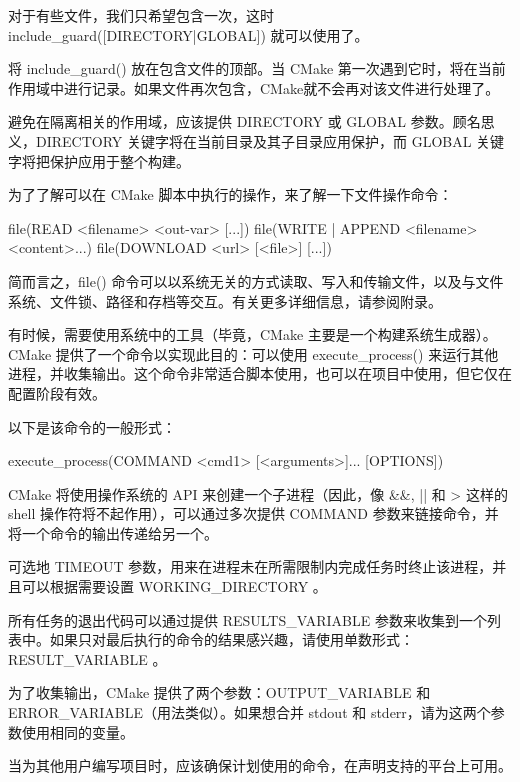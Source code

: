 
对于有些文件，我们只希望包含一次，这时 include\_guard([DIRECTORY|GLOBAL]) 就可以使用了。

将 include\_guard() 放在包含文件的顶部。当 CMake 第一次遇到它时，将在当前作用域中进行记录。如果文件再次包含，CMake就不会再对该文件进行处理了。

避免在隔离相关的作用域，应该提供 DIRECTORY 或 GLOBAL 参数。顾名思义，DIRECTORY 关键字将在当前目录及其子目录应用保护，而 GLOBAL 关键字将把保护应用于整个构建。



为了了解可以在 CMake 脚本中执行的操作，来了解一下文件操作命令：

\begin{shell}
file(READ <filename> <out-var> [...])
file({WRITE | APPEND} <filename> <content>...)
file(DOWNLOAD <url> [<file>] [...])
\end{shell}

简而言之，file() 命令可以以系统无关的方式读取、写入和传输文件，以及与文件系统、文件锁、路径和存档等交互。有关更多详细信息，请参阅附录。


有时候，需要使用系统中的工具（毕竟，CMake 主要是一个构建系统生成器）。CMake 提供了一个命令以实现此目的：可以使用 execute\_process() 来运行其他进程，并收集输出。这个命令非常适合脚本使用，也可以在项目中使用，但它仅在配置阶段有效。

以下是该命令的一般形式：

\begin{shell}
execute_process(COMMAND <cmd1> [<arguments>]... [OPTIONS])
\end{shell}

CMake 将使用操作系统的 API 来创建一个子进程（因此，像 \&\&, || 和 > 这样的 shell 操作符将不起作用），可以通过多次提供 COMMAND 参数来链接命令，并将一个命令的输出传递给另一个。

可选地 TIMEOUT 参数，用来在进程未在所需限制内完成任务时终止该进程，并且可以根据需要设置 WORKING\_DIRECTORY 。

所有任务的退出代码可以通过提供 RESULTS\_VARIABLE 参数来收集到一个列表中。如果只对最后执行的命令的结果感兴趣，请使用单数形式：RESULT\_VARIABLE 。

为了收集输出，CMake 提供了两个参数：OUTPUT\_VARIABLE 和 ERROR\_VARIABLE（用法类似）。如果想合并 stdout 和 stderr，请为这两个参数使用相同的变量。

当为其他用户编写项目时，应该确保计划使用的命令，在声明支持的平台上可用。








